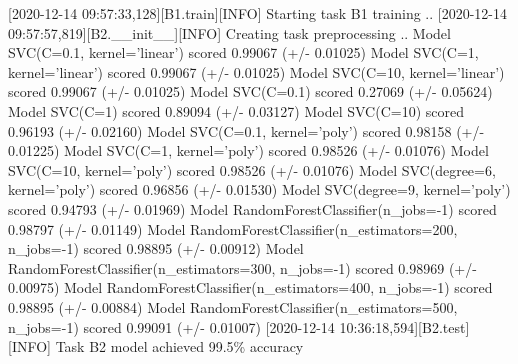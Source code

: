\documentclass[a4paper,11pt]{article}
\begin{document}
[2020-12-14 09:57:33,128][B1.train][INFO] Starting task B1 training ..
[2020-12-14 09:57:57,819][B2.__init__][INFO] Creating task preprocessing ..
Model SVC(C=0.1, kernel='linear') scored 0.99067 (+/- 0.01025)
Model SVC(C=1, kernel='linear') scored 0.99067 (+/- 0.01025)
Model SVC(C=10, kernel='linear') scored 0.99067 (+/- 0.01025)
Model SVC(C=0.1) scored 0.27069 (+/- 0.05624)
Model SVC(C=1) scored 0.89094 (+/- 0.03127)
Model SVC(C=10) scored 0.96193 (+/- 0.02160)
Model SVC(C=0.1, kernel='poly') scored 0.98158 (+/- 0.01225)
Model SVC(C=1, kernel='poly') scored 0.98526 (+/- 0.01076)
Model SVC(C=10, kernel='poly') scored 0.98526 (+/- 0.01076)
Model SVC(degree=6, kernel='poly') scored 0.96856 (+/- 0.01530)
Model SVC(degree=9, kernel='poly') scored 0.94793 (+/- 0.01969)
Model RandomForestClassifier(n_jobs=-1) scored 0.98797 (+/- 0.01149)
Model RandomForestClassifier(n_estimators=200, n_jobs=-1) scored 0.98895 (+/- 0.00912)
Model RandomForestClassifier(n_estimators=300, n_jobs=-1) scored 0.98969 (+/- 0.00975)
Model RandomForestClassifier(n_estimators=400, n_jobs=-1) scored 0.98895 (+/- 0.00884)
Model RandomForestClassifier(n_estimators=500, n_jobs=-1) scored 0.99091 (+/- 0.01007)
[2020-12-14 10:36:18,594][B2.test][INFO] Task B2 model achieved 99.5\% accuracy
\fi
\end{document}
